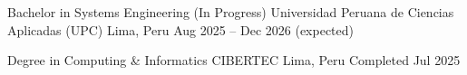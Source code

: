 

\begin{cventries}

  \cventry
    {Bachelor in Systems Engineering (In Progress)} %
    {Universidad Peruana de Ciencias Aplicadas (UPC)} %
    {Lima, Peru} %
  {Aug 2025 -- Dec 2026 (expected)} %
  {}

  \vspace{0.8em}

  \cventry
    {Degree in Computing \& Informatics} %
    {CIBERTEC} %
    {Lima, Peru} %
    {Completed Jul 2025} %
    {}

\end{cventries}
